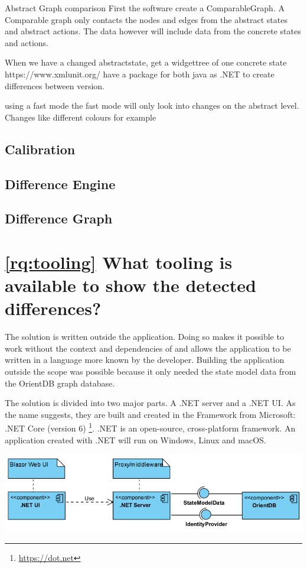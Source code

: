 Abstract Graph comparison
First the software create a ComparableGraph. A Comparable graph only contacts the nodes and edges from the abstract states and abstract actions. The data however will include data from the concrete states and actions. 

When we have a changed abstractstate, get a widgettree of one concrete state
https://www.xmlunit.org/  have a package for both java as .NET to create differences between version.

using a fast mode
the fast mode will only look into changes on the abstract level. Changes like different colours for example


\subsection{Calibration}
\subsection{Difference Engine}
\subsection{Difference Graph}


\section{\ref{rq:tooling} What tooling is available to show the detected differences?}

The solution is written outside the \testar application. Doing so makes it possible to work without the context and dependencies of \testar and allows the application to be written in a language more known by the developer. Building the application outside the \testar scope was possible because it only needed the state model data from the OrientDB graph database.

The solution is divided into two major parts. A \testar .NET server and a \testar .NET UI. As the name suggests, they are built and created in the Framework from Microsoft: .NET Core (version 6) \footnote{\url{https://dot.net}}. .NET is an open-source, cross-platform framework. An application created with .NET will run on Windows, Linux and macOS. 

\begingroup
\captionsetup{type=figure}
\includegraphics[scale=0.7]{thesis/images/server-ui-comp.png}
\label{fig:components}
\endgroup

